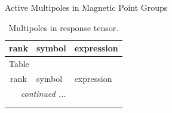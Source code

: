 \documentclass[fleqn,9pt,landscape]{jsarticle}
\begin{document}
\setcounter{MaxMatrixCols}{32}

\renewcommand{\tablename}{Table~}
\renewcommand{\figurename}{Figure~}
\begin{center}
\LARGE
Active Multipoles in Magnetic Point Groups
\end{center}
\renewcommand{\arraystretch}{1.6}
\begin{longtable}{cll}
\caption{Multipoles in response tensor.}
 \\
 \hline \hline
rank & symbol & expression \\ \hline \endfirsthead

\multicolumn{2}{l}{\tablename\ \thetable{}} \\
 \hline \hline
rank & symbol & expression \\ \hline \endhead

 \hline \hline
\multicolumn{2}{r}{\footnotesize\it continued ...} \\ \endfoot

 \hline \hline
\multicolumn{2}{r}{} \\ \endlastfoot


\end{longtable}
\end{document}
